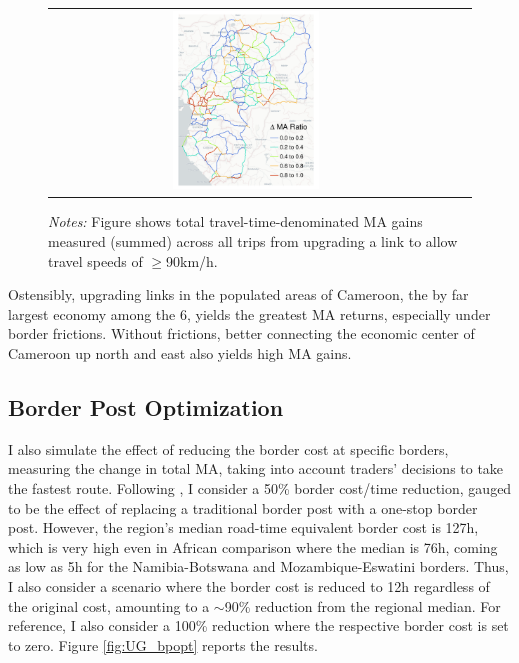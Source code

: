 \documentclass[a4paper]{article}
\begin{document}
\begin{figure}[H]
{\begin{tabular}{@{}c@{}c@{}@{}c@{}}
\includegraphics[width=0.38\textwidth, trim= {0.9cm 0 0.9cm 0}, clip]{"../figures/PE/trans_CEMAC_network_MACR_90_min_speed_bt_ratio_google.pdf"}
\end{tabular}
}
\raggedright
\scriptsize 
\emph{Notes:} Figure shows total travel-time-denominated MA gains measured (summed) across all trips from upgrading a link to allow travel speeds of $\geq$90km/h. \\ \vspace{-2mm}
\end{figure}

Ostensibly, upgrading links in the populated areas of Cameroon, the by far largest economy among the 6, yields the greatest MA returns, especially under border frictions. Without frictions, better connecting the economic center of Cameroon up north and east also yields high MA gains.  

\subsection{Border Post Optimization}

I also simulate the effect of reducing the border cost at specific borders, measuring the change in total MA, taking into account traders' decisions to take the fastest route. Following \citet{fontagne2023trade}, I consider a 50\% border cost/time reduction, gauged to be the effect of replacing a traditional border post with a one-stop border post. However, the region's median road-time equivalent border cost is 127h, which is very high even in African comparison where the median is 76h, coming as low as 5h for the Namibia-Botswana and Mozambique-Eswatini borders. Thus, I also consider a scenario where the border cost is reduced to 12h regardless of the original cost, amounting to a $\sim$90\% reduction from the regional median. For reference, I also consider a 100\% reduction where the respective border cost is set to zero. Figure \ref{fig:UG_bpopt} reports the results.
\end{document}
